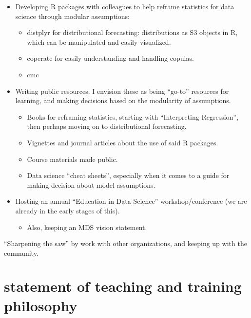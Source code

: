 \documentclass[]{article}
\providecommand{\tightlist}{%
  \setlength{\itemsep}{0pt}\setlength{\parskip}{0pt}}
\begin{document}
\begin{itemize}
\tightlist
\item
  Developing R packages with colleagues to help reframe statistics for data science through modular assumptions:

  \begin{itemize}
  \tightlist
  \item
    distplyr for distributional forecasting: distributions as S3 objects in R, which can be manipulated and easily visualized.
  \item
    coperate for easily understanding and handling copulas.
  \item
    cmc
  \end{itemize}
\item
  Writing public resources. I envision these as being ``go-to'' resources for learning, and making decisions based on the modularity of assumptions.

  \begin{itemize}
  \tightlist
  \item
    Books for reframing statistics, starting with ``Interpreting Regression'', then perhaps moving on to distributional forecasting.
  \item
    Vignettes and journal articles about the use of said R packages.
  \item
    Course materials made public.
  \item
    Data science ``cheat sheets'', especially when it comes to a guide for making decision about model assumptions.
  \end{itemize}
\item
  Hosting an annual ``Education in Data Science'' workshop/conference (we are already in the early stages of this).

  \begin{itemize}
  \tightlist
  \item
    Also, keeping an MDS vision statement.
  \end{itemize}
\end{itemize}

``Sharpening the saw'' by work with other organizations, and keeping up with the community.

\hypertarget{statement-of-teaching-and-training-philosophy}{%
\section{statement of teaching and training philosophy}\label{statement-of-teaching-and-training-philosophy}}
\end{document}
